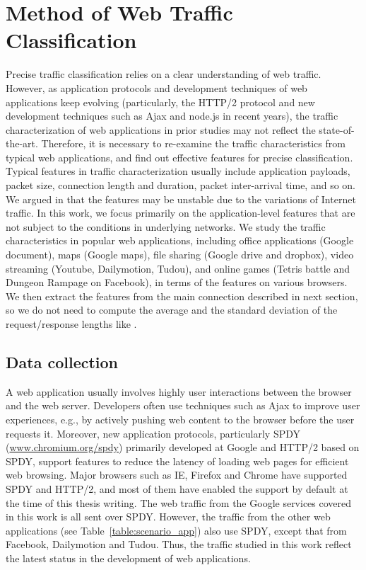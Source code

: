 \chapter{Method of Web Traffic Classification}

Precise traffic classification relies on a clear understanding of web traffic. However, as application protocols and development techniques of web applications keep evolving (particularly, the HTTP/2 protocol \cite{HTTP2} and new development techniques such as Ajax and node.js in recent years), the traffic characterization of web applications in prior studies may not reflect the state-of-the-art. Therefore, it is necessary to re-examine the traffic characteristics from typical web applications, and find out effective features for precise classification. Typical features in traffic characterization usually include application payloads, packet size, connection length and duration, packet inter-arrival time, and so on. We argued in \cite{TFT14} that the features may be unstable due to the variations of Internet traffic. In this work, we focus primarily on the application-level features that are not subject to the conditions in underlying networks. We study the traffic characteristics in popular web applications, including office applications (Google document), maps (Google maps), file sharing (Google drive and dropbox), video streaming (Youtube, Dailymotion, Tudou), and online games (Tetris battle and Dungeon Rampage on Facebook), in terms of the features on various browsers. We then extract the features from the main connection described in next section, so we do not need to compute the average and the standard deviation of the request/response lengths like \cite{TFT14}. 

\section{Data collection}
\label{sec:collect}

A web application usually involves highly user interactions between the browser and the web server. Developers often use techniques such as Ajax to improve user experiences, e.g., by actively pushing web content to the browser before the user requests it. Moreover, new application protocols, particularly SPDY (\url{www.chromium.org/spdy}) primarily developed at Google and HTTP/2 based on SPDY, support features to reduce the latency of loading web pages for efficient web browsing. Major browsers such as IE, Firefox and Chrome have supported SPDY and HTTP/2, and most of them have enabled the support by default at the time of this thesis writing. The web traffic from the Google services covered in this work is all sent over SPDY. However, the traffic  from the other web applications (see Table~\ref{table:scenario_app}) also use SPDY, except that from Facebook, Dailymotion and Tudou. Thus, the traffic studied in this work reflect the latest status in the development of web applications.  

